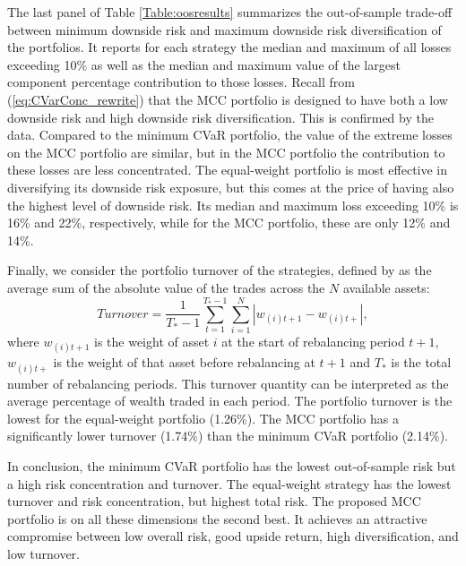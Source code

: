 \documentclass[12pt,a4paper]{article}
\begin{document}
The last panel of Table \ref{Table:oosresults} summarizes the out-of-sample trade-off between minimum downside risk and maximum downside risk diversification of the portfolios. It reports for each strategy the median and maximum of all losses exceeding 10\% as well as the median and maximum value of the largest component percentage contribution to those losses. Recall from (\ref{eq:CVarConc_rewrite}) that the MCC portfolio is designed to have both a low downside risk and high downside risk diversification. This is confirmed by the data. Compared to the minimum CVaR portfolio, the value of the extreme losses on the MCC portfolio are similar, but in the MCC portfolio the contribution to these losses are less concentrated. The equal-weight portfolio is most effective in diversifying its downside risk exposure, but this comes at the price of having also the highest level of downside risk. Its median and maximum loss exceeding 10\% is 16\% and 22\%, respectively, while for the MCC portfolio, these are only 12\% and 14\%.

Finally, we consider the portfolio turnover of the strategies, defined by \citet{DeMiguel2009} as the average sum of the absolute value of the trades across the $N$ available assets:
\begin{equation} Turnover = \frac{1}{T_*-1} \sum_{t=1}^{T_*-1} \sum_{i=1}^N | w_{(i)t+1}-w_{(i)t+} |,
\label{eq:turnover} \end{equation}
where $w_{(i)t+1}$ is the weight of asset $i$ at the start of rebalancing period $t+1$, $w_{(i)t+}$ is the weight of that asset before rebalancing at $t+1$ and $T_*$ is the total number of rebalancing periods. This turnover quantity can be interpreted as the average percentage of wealth traded in each period. The portfolio turnover is the lowest for the equal-weight portfolio (1.26\%).  The MCC portfolio has a significantly lower turnover (1.74\%) than the minimum CVaR portfolio (2.14\%).

	In conclusion, the minimum CVaR portfolio has the lowest out-of-sample risk but a high risk concentration and turnover. The equal-weight strategy has the lowest turnover and risk concentration, but highest total risk. The proposed MCC portfolio is on all these dimensions the second best. It achieves an attractive compromise between low overall risk, good upside return, high diversification, and low turnover.
\end{document}
